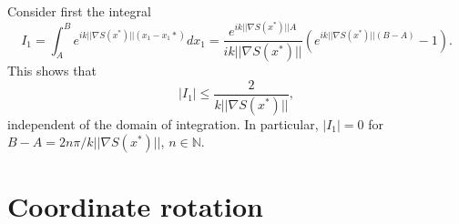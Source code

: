 \documentclass{article}
\newcommand{\norm}[1]{||#1||}
\theoremstyle{plain}
\begin{document}

Consider first the integral
\begin{equation}
	I_1 = \int_A^B e^{ik\norm{\nabla S(x^*)}(x_1-x_1*)} dx_1 = \frac{e^{ik\norm{\nabla S(x^*)}A}}{ik\norm{\nabla S(x^*)}} \left( e^{ik\norm{\nabla S(x^*)}(B-A)}-1 \right).
\end{equation}
This shows that
\begin{equation}
	|I_1| \leq \frac{2}{k\norm{\nabla S(x^*)}},
\end{equation}
independent of the domain of integration.
In particular, $|I_1| = 0$ for $B-A = 2n\pi / k\norm{\nabla S(x^*)}$, $n\in\mathbb{N}$.





\section{Coordinate rotation}\label{sec_rotation}
\end{document}
